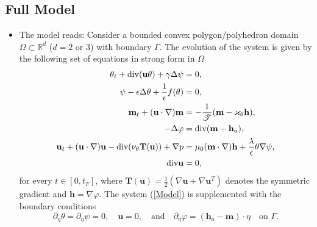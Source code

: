 \documentclass[9pt]{beamer}
\newcommand{\Real}{\mathbb R}
\newcommand{\grad}{\nabla}
\newcommand{\diverg}{\textup{div} }
\newcommand{\eps}{\epsilon}
\newcommand{\lap}{\Delta}
\begin{document}
\subsection{Full Model}
\begin{frame}
\begin{itemize}
	\item The model reads: Consider a bounded convex polygon/polyhedron domain $\Omega\subset \Real^d$ ($d=2$ or $3$) with boundary $\Gamma$. The evolution of the system is given by the following set of equations in strong form in $\Omega$
	\begin{subequations}\label{Model}
		\begin{align}
		\label{Cahn-Hilliard:1}\theta_t + \diverg(\mathbf{u}\theta) + \gamma \lap \psi &= 0,\\
		\label{Cahn-Hilliard:2}\psi - \eps \lap \theta + \frac{1}{\eps}f(\theta) &= 0,\\
		\label{Advection-Reaction}\mathbf{m}_t + (\mathbf{u}\cdot \grad)\mathbf{m}&=-\frac{1}{\mathscr{T}}(\mathbf{m} - \varkappa_\theta\mathbf{h}),\\
		\label{MagScalarPot}-\lap \varphi &=\diverg(\mathbf{m}-\mathbf{h}_a),\\
		\label{NavierStokes}\mathbf{u}_t + (\mathbf{u}\cdot\grad)\mathbf{u} - \diverg (\nu_\theta \mathbf{T(u)}) + \grad p &= \mu_0(\mathbf{m}\cdot \grad)\mathbf{h} + \frac{\lambda}{\eps}\theta\grad \psi,\\
		\label{DivFree}\diverg \mathbf{u} &= 0,
		\end{align}
	\end{subequations}
	for every $t\in[0,t_F]$, where $\mathbf{T(u)}=\frac{1}{2}(\grad \mathbf{u} + \grad\mathbf{u}^T)$ denotes the symmetric gradient and $\mathbf{h}=\grad \varphi$. The system (\ref{Model}) is supplemented with the boundary conditions
	\begin{equation}\label{ModelBC}
	\partial_\eta \theta = \partial_\eta\psi = 0,\quad \mathbf{u}=0,\quad\text{and}\quad \partial_\eta\varphi = (\mathbf{h}_a - \mathbf{m})\cdot\eta \quad \text{on }\Gamma.
	\end{equation}
\end{itemize}
\end{frame}
\end{document}
